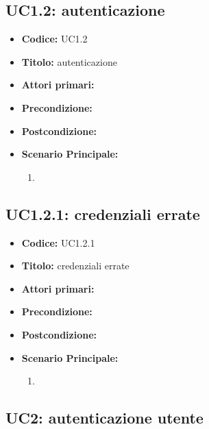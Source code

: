 ﻿\documentclass[../analisi-dei-requisiti]{subfiles}
\begin{document}
\subsection{UC1.2: autenticazione}
\label{sub:uc1.2utente}
\begin{itemize}
  \item \textbf{Codice:} UC1.2
  \item \textbf{Titolo:} autenticazione
  \item \textbf{Attori primari:}
  \item \textbf{Precondizione:}
  \item \textbf{Postcondizione:}
  \item \textbf{Scenario Principale:}
  \begin{enumerate}
    \item
  \end{enumerate}
\end{itemize}

\subsection{UC1.2.1: credenziali errate}
\label{sub:uc1.2.1utente}
\begin{itemize}
  \item \textbf{Codice:} UC1.2.1
  \item \textbf{Titolo:} credenziali errate
  \item \textbf{Attori primari:}
  \item \textbf{Precondizione:}
  \item \textbf{Postcondizione:}
  \item \textbf{Scenario Principale:}
  \begin{enumerate}
    \item
  \end{enumerate}
\end{itemize}


\subsection{UC2: autenticazione utente}
\label{sub:uc2utente}

\end{document}
